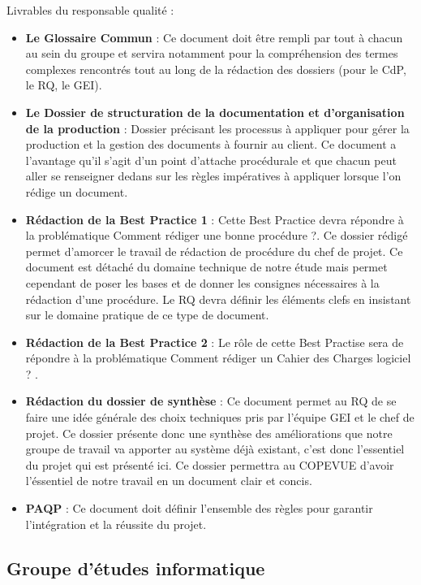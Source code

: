 Livrables du responsable qualité :   

\begin{itemize}
\item \textbf{Le Glossaire Commun} : Ce document doit être rempli par tout à chacun au sein du groupe et servira notamment pour la compréhension des termes complexes rencontrés tout au long de la rédaction des dossiers (pour le CdP, le RQ, le GEI).
\item \textbf{Le Dossier de structuration de la documentation et d'organisation de la production} : Dossier précisant les processus à appliquer pour gérer la production et la gestion des documents à fournir au client. Ce document a l'avantage qu'il s'agit d'un point d'attache procédurale et que chacun peut aller se renseigner dedans sur les règles impératives à appliquer lorsque l'on rédige un document.
\item \textbf{Rédaction de la Best Practice 1} : Cette Best Practice devra répondre à la problématique \og Comment rédiger une bonne procédure ?\fg. Ce dossier rédigé permet d'amorcer le travail de rédaction de procédure du chef de projet. Ce document est détaché du domaine technique de notre étude mais permet cependant de poser les bases et de donner les consignes nécessaires à la rédaction d'une procédure. Le RQ devra définir les éléments clefs en insistant sur le domaine pratique de ce type de document.
\item \textbf{Rédaction de la Best Practice 2} : Le rôle de cette Best Practise sera de répondre à la problématique \og Comment rédiger un Cahier des Charges logiciel ? \fg.
\item \textbf{Rédaction du dossier de synthèse} : Ce document permet au RQ de se faire une idée générale des choix techniques pris par l'équipe GEI et le chef de projet. Ce dossier présente donc une synthèse des améliorations que notre groupe de travail va apporter au système déjà existant, c'est donc l'essentiel du projet qui est présenté ici. Ce dossier permettra au COPEVUE d'avoir l'éssentiel de notre travail en un document clair et concis.
\item \textbf{PAQP} : Ce document doit définir l'ensemble des règles pour garantir l'intégration et la réussite du projet.
\end{itemize}

    \subsection{Groupe d'études informatique}

